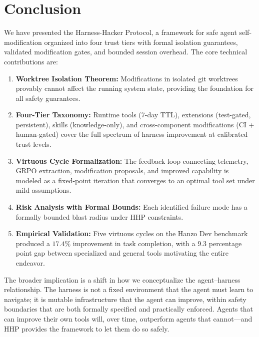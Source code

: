 \section{Conclusion}

\label{sec:conclusion}

We have presented the Harness-Hacker Protocol, a framework for safe agent
self-modification organized into four trust tiers with formal isolation
guarantees, validated modification gates, and bounded session overhead. The
core technical contributions are:

\begin{enumerate}[leftmargin=1.5em]
    \item \textbf{Worktree Isolation Theorem:} Modifications in isolated git
          worktrees provably cannot affect the running system state, providing
          the foundation for all safety guarantees.
    \item \textbf{Four-Tier Taxonomy:} Runtime tools (7-day TTL), extensions
          (test-gated, persistent), skills (knowledge-only), and cross-component
          modifications (CI + human-gated) cover the full spectrum of harness
          improvement at calibrated trust levels.
    \item \textbf{Virtuous Cycle Formalization:} The feedback loop connecting
          telemetry, GRPO extraction, modification proposals, and improved
          capability is modeled as a fixed-point iteration that converges to an
          optimal tool set under mild assumptions.
    \item \textbf{Risk Analysis with Formal Bounds:} Each identified failure
          mode has a formally bounded blast radius under HHP constraints.
    \item \textbf{Empirical Validation:} Five virtuous cycles on the Hanzo Dev
          benchmark produced a $17.4\%$ improvement in task completion, with a
          $9.3$ percentage point gap between specialized and general tools
          motivating the entire endeavor.
\end{enumerate}

The broader implication is a shift in how we conceptualize the agent--harness
relationship. The harness is not a fixed environment that the agent must learn
to navigate; it is mutable infrastructure that the agent can improve, within
safety boundaries that are both formally specified and practically enforced.
Agents that can improve their own tools will, over time, outperform agents
that cannot---and HHP provides the framework to let them do so safely.

\appendix

